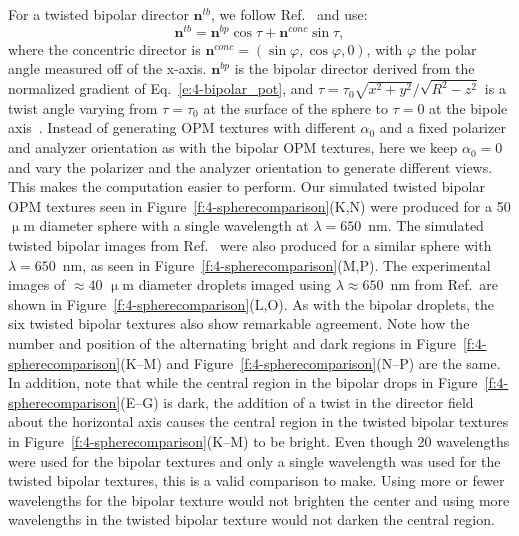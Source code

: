 For a twisted bipolar director $\mathbf{n}^{tb}$, we follow Ref.~\cite{RN177} and use:
\begin{equation}
\mathbf{n}^{tb} = \mathbf{n}^{bp}\cos\tau +\mathbf{n}^{conc}\sin\tau,
\end{equation}
where the concentric director is $\mathbf{n}^{conc} = (\sin \varphi,\cos \varphi,0)$, with $\varphi$ the polar angle measured off of the x-axis.
$\mathbf{n}^{bp}$ is the bipolar director derived from the normalized gradient of Eq.~\ref{e:4-bipolar_pot}, and $\tau = \tau_0\sqrt{x^2+y^2}/\sqrt{R^2-z^2}$ is a twist angle varying from $\tau=\tau_0$ at the surface of the sphere to $\tau=0$ at the bipole axis~\cite{RN177}.
Instead of generating OPM textures with different $\alpha_0$ and a fixed polarizer and analyzer orientation as with the bipolar OPM textures, here we keep $\alpha_0=0$ and vary the polarizer and the analyzer orientation to generate different views.
This makes the computation easier to perform. Our simulated twisted bipolar OPM textures seen in Figure~\ref{f:4-spherecomparison}(K,N) were produced for a 50 $\upmu$m diameter sphere with a single wavelength at $\lambda = 650$~nm.
The simulated twisted bipolar images from Ref.~\cite{RN193} were also produced for a similar sphere with $\lambda = 650$~nm, as seen in Figure~\ref{f:4-spherecomparison}(M,P).
The experimental images of $\approx 40$ $\upmu$m diameter droplets imaged using $\lambda \approx 650$~nm from Ref.~\cite{RN193}are shown in Figure~\ref{f:4-spherecomparison}(L,O).
As with the bipolar droplets, the six twisted bipolar textures also show remarkable agreement.
Note how the number and position of the alternating bright and dark regions in Figure~\ref{f:4-spherecomparison}(K--M) and Figure~\ref{f:4-spherecomparison}(N--P) are the same.
In addition, note that while the central region in the bipolar drops in Figure~\ref{f:4-spherecomparison}(E--G) is dark, the addition of a twist in the director field about the horizontal axis causes the central region in the twisted bipolar textures in Figure~\ref{f:4-spherecomparison}(K--M) to be bright.
Even though 20 wavelengths were used for the bipolar textures and only a single wavelength was used for the twisted bipolar textures, this is a valid comparison to make.
Using more or fewer wavelengths for the bipolar texture would not brighten the center and using more wavelengths in the twisted bipolar texture would not darken the central region.



